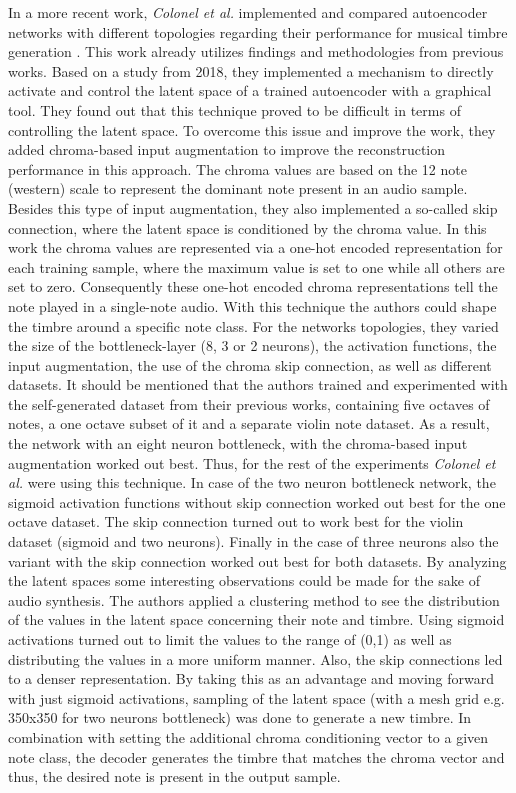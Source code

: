 In a more recent work, \textit{Colonel et al.} implemented and compared autoencoder networks with different topologies regarding their performance for musical timbre generation \cite{Colonel2020}. This work already utilizes findings and methodologies from previous works. Based on a study from 2018, they implemented a mechanism to directly activate and control the latent space of a trained autoencoder with a graphical tool. They found out that this technique proved to be difficult in terms of controlling the latent space. To overcome this issue and improve the work, they added chroma-based input augmentation to improve the reconstruction performance in this approach. The chroma values are based on the 12 note (western) scale to represent the dominant note present in an audio sample. Besides this type of input augmentation, they also implemented a so-called skip connection, where the latent space is conditioned by the chroma value. In this work the chroma values are represented via a one-hot encoded representation for each training sample, where the maximum value is set to one while all others are set to zero. Consequently these one-hot encoded chroma representations tell the note played in a single-note audio. With this technique the authors could shape the timbre around a specific note class. For the networks topologies, they varied the size of the bottleneck-layer (8, 3 or 2 neurons), the activation functions, the input augmentation, the use of the chroma skip connection, as well as different datasets. It should be mentioned that the authors trained and experimented with the self-generated dataset from their previous works, containing five octaves of notes, a one octave subset of it and a separate violin note dataset. As a result, the network with an eight neuron bottleneck, with the chroma-based input augmentation worked out best. Thus, for the rest of the experiments \textit{Colonel et al.} were using this technique. In case of the two neuron bottleneck network, the sigmoid activation functions without skip connection worked out best for the one octave dataset. The skip connection turned out to work best for the violin dataset (sigmoid and two neurons). Finally in the case of three neurons also the variant with the skip connection worked out best for both datasets. By analyzing the latent spaces some interesting observations could be made for the sake of audio synthesis. The authors applied a clustering method to see the distribution of the values in the latent space concerning their note and timbre. Using sigmoid activations turned out to limit the values to the range of (0,1) as well as distributing the values in a more uniform manner. Also, the skip connections led to a denser representation. By taking this as an advantage and moving forward with just sigmoid activations, sampling of the latent space (with a mesh grid e.g. 350x350 for two neurons bottleneck) was done to generate a new timbre. In combination with setting the additional chroma conditioning vector to a given note class, the decoder generates the timbre that matches the chroma vector and thus, the desired note is present in the output sample.

